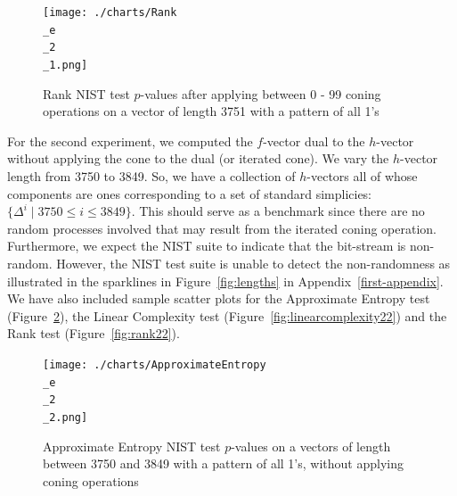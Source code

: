 \documentclass[oneside,12pt]{amsart}
\theoremstyle{definition}
\numberwithin{equation}{section}
\begin{document}
\begin{figure}[h!]
\centering
\caption{Rank NIST test $p$-values after applying between 0 - 99 coning operations on a vector of length 3751 with a pattern of all 1's}
\texttt{[image: ./charts/Rank\\\_e\\\_2\\\_1.png]}
\label{fig:rank21}
\end{figure}

\clearpage
\indent For the second experiment, we computed the $f$-vector dual to the $h$-vector without applying the cone to the dual (or iterated cone). We vary the $h$-vector length from 3750 to 3849. So, we have a collection of $h$-vectors all of whose components are ones corresponding to a set of standard simplicies:  $\{\Delta^i \;| \; 3750 \leq i \leq 3849\}$.  This should serve as a benchmark since there are no random processes involved that may result from the iterated coning operation. Furthermore, we expect the NIST suite to indicate that the bit-stream is non-random. However, the NIST test suite is unable to detect the non-randomness as illustrated in the sparklines in Figure~\ref{fig:lengths} in Appendix~\ref{first-appendix}.  We have also included sample scatter plots for the Approximate Entropy test (Figure~\ref{fig:approxentropy22}), the Linear Complexity test (Figure~\ref{fig:linearcomplexity22}) and the Rank test (Figure~\ref{fig:rank22}).  %



\vspace{1cm}

\begin{figure}[h!]
\centering
\caption{Approximate Entropy NIST test $p$-values on a vectors of length between 3750 and 3849 with a pattern of all 1's, without applying coning operations}
\texttt{[image: ./charts/ApproximateEntropy\\\_e\\\_2\\\_2.png]}
\label{fig:approxentropy22}
\end{figure}
\end{document}
